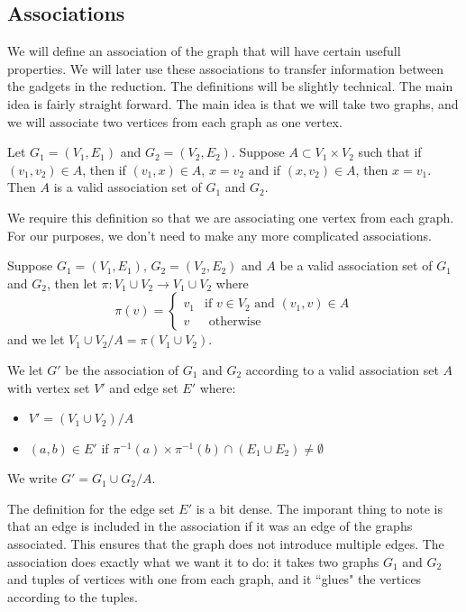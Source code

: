 \documentclass[runningheads,a4paper]{llncs}
\begin{document}
\subsection{Associations}

We will define an association of the graph that will have certain usefull properties. We will later use these associations to transfer information between the gadgets in the reduction. The definitions will be slightly technical. The main idea is fairly straight forward. The main idea is that we will take two graphs, and we will associate two vertices from each graph as one vertex. 

\begin{definition}
Let $G_1 = (V_1, E_1)$ and $G_2 = (V_2, E_2)$. Suppose $A \subset V_1 \times V_2$ such that
if $(v_1, v_2) \in A$, then if $(v_1, x) \in A$, $x = v_2$ and if $(x, v_2) \in A$, then $x = v_1$. Then $A$ is a valid association set of $G_1$ and $G_2$. 
\end{definition}

We require this definition so that we are associating one vertex from each graph. For our purposes, we don't need to make any more complicated associations.

\begin{definition}
Suppose $G_1 = (V_1, E_1)$, $G_2 = (V_2, E_2)$ and $A$ be a valid association set of $G_1$ and $G_2$, then let $\pi: V_1 \cup V_2 \rightarrow V_1 \cup V_2$ where
\[ \pi(v) = \left\{ \begin{array}{cc} v_1 & \text{if } v \in V_2 \text{ and } (v_1, v) \in A \\
							v & \text{ otherwise }
						      \end{array} \right. \]
and we let $V_1 \cup V_2 / A = \pi(V_1 \cup V_2)$.
\end{definition}

\begin{definition}
We let $G'$ be the association of $G_1$ and $G_2$ according to a valid association set $A$ with vertex set $V'$ and edge set $E'$ where:
\begin{itemize}
\item $V' = (V_1 \cup V_2) / A$
\item $(a,b) \in E'$ if $\pi^{-1}(a) \times \pi^{-1}(b) \cap (E_1 \cup E_2) \neq \emptyset$
\end{itemize}
We write $G' = G_1 \cup G_2 / A$.
\end{definition}

The definition for the edge set $E'$ is a bit dense. The imporant thing to note is that an edge is included in the association if it was an edge of the graphs associated. This ensures that the graph does not introduce multiple edges. The association does exactly what we want it to do: it takes two graphs $G_1$ and $G_2$ and tuples of vertices with one from each graph, and it ``glues" the vertices according to the tuples. 
\end{document}
